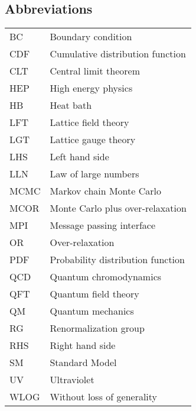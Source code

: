 \documentclass[12pt]{book}
\theoremstyle{definition}
\newenvironment{frontstuff}
  {\centering\chapter*{}}
  {\clearpage}
\begin{document}
\begin{frontstuff}
\section*{Abbreviations}
\begin{tabular}{ll}
BC      &       Boundary condition \\
CDF     &       Cumulative distribution function \\
CLT     &       Central limit theorem\\
HEP     &       High energy physics\\
HB      &       Heat bath\\
LFT     &       Lattice field theory\\
LGT     &       Lattice gauge theory\\
LHS     &       Left hand side\\
LLN     &       Law of large numbers\\
MCMC    &       Markov chain Monte Carlo\\
MCOR    &       Monte Carlo plus over-relaxation \\
MPI     &       Message passing interface \\
OR      &       Over-relaxation \\
PDF     &       Probability distribution function \\
QCD     &       Quantum chromodynamics \\
QFT     &       Quantum field theory \\
QM      &       Quantum mechanics \\
RG      &       Renormalization group \\
RHS     &       Right hand side \\
SM      &       Standard Model \\
UV      &       Ultraviolet \\
WLOG    &       Without loss of generality
\end{tabular}
\clearpage


\end{frontstuff}
\end{document}
